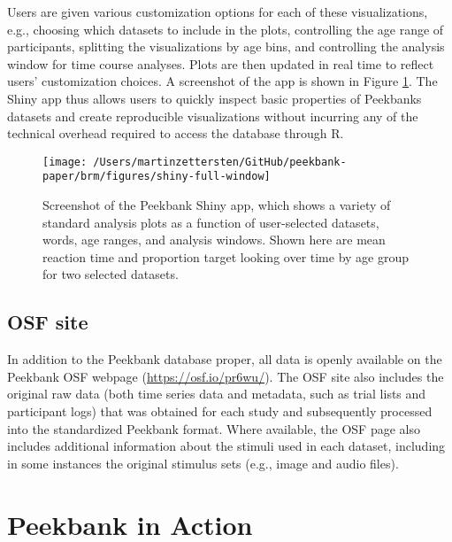 \documentclass[
  english,
  man,floatsintext]{apa6}
\begin{document}
Users are given various customization options for each of these visualizations, e.g., choosing which datasets to include in the plots, controlling the age range of participants, splitting the visualizations by age bins, and controlling the analysis window for time course analyses.
Plots are then updated in real time to reflect users' customization choices.
A screenshot of the app is shown in Figure \ref{fig:shiny}.
The Shiny app thus allows users to quickly inspect basic properties of Peekbanks datasets and create reproducible visualizations without incurring any of the technical overhead required to access the database through R.

\begin{figure}

{\centering \texttt{[image: /Users/martinzettersten/GitHub/peekbank-paper/brm/figures/shiny-full-window]} 

}

\caption{Screenshot of the Peekbank Shiny app, which shows a variety of standard analysis plots as a function of user-selected datasets, words, age ranges, and analysis windows. Shown here are mean reaction time and proportion target looking over time by age group for two selected datasets.}\label{fig:shiny}
\end{figure}

\hypertarget{osf-site}{%
\subsection{OSF site}\label{osf-site}}

In addition to the Peekbank database proper, all data is openly available on the Peekbank OSF webpage (\url{https://osf.io/pr6wu/}).
The OSF site also includes the original raw data (both time series data and metadata, such as trial lists and participant logs) that was obtained for each study and subsequently processed into the standardized Peekbank format.
Where available, the OSF page also includes additional information about the stimuli used in each dataset, including in some instances the original stimulus sets (e.g., image and audio files).

\hypertarget{peekbank-in-action}{%
\section{Peekbank in Action}\label{peekbank-in-action}}
\end{document}
